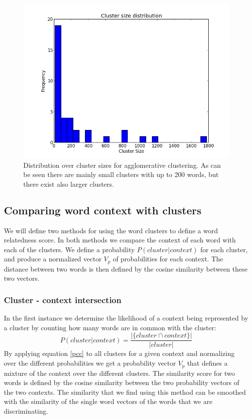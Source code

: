 \documentclass[11pt]{article}
\begin{document}
\begin{figure}
\center
\includegraphics[scale=0.40]{images/cluster_size.png}
\caption{Distribution over cluster sizes for agglomerative clustering. As can be seen there are mainly small clusters with up to 200 words, but there exist also larger clusters.}
\label{cluster_size}
\end{figure}

\subsection{Comparing word context with clusters}
We will define two methods for using the word clusters to define a word relatedness score. In both methods we compare the context of each word with each of the clusters. We define a probability $P( cluster | context )$ for each cluster, and produce a normalized vector $V_p$ of probabilities for each context. The distance between two words is then defined by the cosine similarity between these two vectors.

\subsubsection{Cluster - context intersection}
\label{remi1}
In the first instance we determine the likelihood of a context being represented by a cluster by counting how many words are in common with the cluster:
\begin{equation} \label{pcc}P( \textit{cluster} | \textit{context}) = \frac{ | \{\textit{cluster} \cap \textit{context}\} |  }{| \textit{cluster} |} \end{equation}
By applying equation \ref{pcc} to all clusters for a given context and normalizing over the different probabilities we get a probability vector $V_{p}$ that defines a mixture of the context over the different clusters. The similarity score for two words is defined by the cosine similarity between the two probability vectors of the two contexts. The similarity that we find using this method can be smoothed with the similarity of the single word vectors of the words that we are discriminating.
\end{document}
